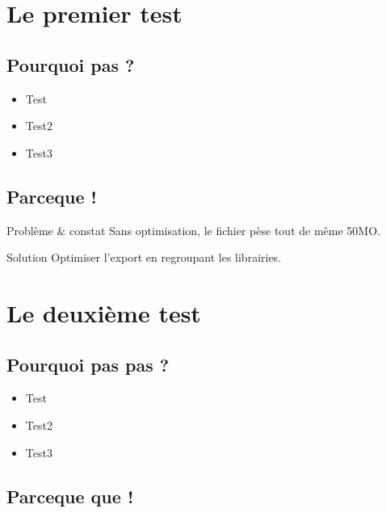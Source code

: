 \documentclass{beamer}
\begin{document}
\section{Le premier test}

\subsection{Pourquoi pas ?}
\begin{frame}
\begin{itemize}
	\item Test
	\item Test2
	\item Test3
\end{itemize}
\end{frame}

\subsection{Parceque !}
\begin{frame}
\begin{alertblock}{Problème \& constat}
Sans optimisation, le fichier pèse tout de même \alert{50MO}.
\end{alertblock}

\pause

\begin{solution}{Solution}
Optimiser l'export en regroupant les librairies.
\end{solution}
\end{frame}

\section{Le deuxième test}
\subsection{Pourquoi pas pas ?}
\begin{frame}
\begin{itemize}
	\item Test
	\item Test2
	\item Test3
\end{itemize}
\end{frame}


\subsection{Parceque que !}
\end{document}
